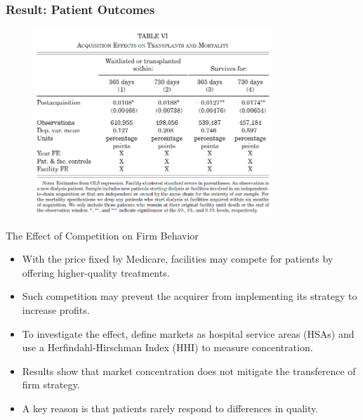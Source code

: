 \documentclass[aspectratio=169]{beamer}
\begin{document}
\begin{frame}\frametitle{Result: Patient Outcomes}
\setlength{\leftmargini}{12pt}
\vspace{-7.5mm}
 \begin{figure}[h!]
        \centering
        \includegraphics[width=90mm]{figure3_4.png}
        \label{fig:method}
        \end{figure}
        \vspace{-9.5mm}

\end{frame}

\begin{frame}{The Effect of Competition on Firm Behavior}

\begin{itemize}
\item With the price fixed by Medicare, facilities may compete for patients by offering higher-quality treatments.
\item Such competition may prevent the acquirer from implementing its strategy to increase profits.
\item To investigate the effect, define markets as hospital service areas (HSAs) and use a Herfindahl-Hirschman Index (HHI) to measure concentration.
\item Results show that market concentration does not mitigate the transference of firm strategy.
\item A key reason is that patients rarely respond to differences in quality.

\end{itemize}

\end{frame}
\end{document}
